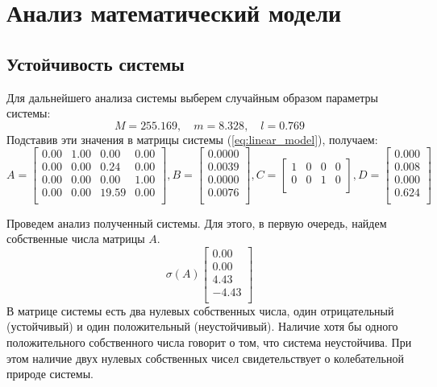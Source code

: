 \section{Анализ математический модели}
\subsection{Устойчивость системы} 
Для дальнейшего анализа системы выберем случайным образом параметры системы:
\begin{equation}
    M = 255.169,\quad m = 8.328,\quad l = 0.769
\end{equation}
Подставив эти значения в матрицы системы (\ref{eq:linear_model}), получаем: 
\begin{equation}
    A = \begin{bmatrix}
        0.00  & 1.00  & 0.00  & 0.00 \\ 
        0.00  & 0.00  & 0.24  & 0.00 \\ 
        0.00  & 0.00  & 0.00  & 1.00 \\ 
        0.00  & 0.00  & 19.59  & 0.00 \\ 
    \end{bmatrix},
    B = \begin{bmatrix}
        0.0000 \\ 
        0.0039 \\ 
        0.0000 \\ 
        0.0076 \\ 
    \end{bmatrix},
    C = \begin{bmatrix}
        1  & 0  & 0  & 0 \\ 
        0  & 0  & 1  & 0 \\ 
    \end{bmatrix},
    D = \begin{bmatrix}
        0.000 \\ 
        0.008 \\ 
        0.000 \\ 
        0.624 \\ 
    \end{bmatrix}
\end{equation}

Проведем анализ полученный системы. Для этого, в первую очередь, найдем собственные числа матрицы $A$. 
\begin{equation}
    \sigma(A) \begin{bmatrix}
        0.00 \\ 
        0.00 \\ 
        4.43 \\ 
        -4.43 \\  
    \end{bmatrix}
\end{equation}
В матрице системы есть два нулевых собственных числа, один отрицательный (устойчивый) и один положительный (неустойчивый). 
Наличие хотя бы одного положительного собственного числа говорит о том, что система неустойчива. При этом 
наличие двух нулевых собственных чисел свидетельствует о колебательной природе системы. 

